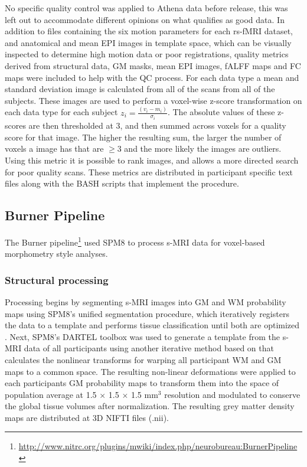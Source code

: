\documentclass[preprint,12pt,5p]{elsarticle}
\begin{document}
\begin{itemize}
No specific quality control was applied to Athena data before release, this was left out to accommodate different opinions on what qualifies as good data. In addition to files containing the six motion parameters for each rs-fMRI dataset, and anatomical and mean EPI images in template space, which can be visually inspected to determine high motion data or poor registrations, quality metrics derived from structural data, GM masks, mean EPI images, fALFF maps and FC maps were included to help with the QC process. For each data type a mean and standard deviation image is calculated from all of the scans from all of the subjects. These images are used to perform a voxel-wise z-score transformation on each data type for each subject $z_i = \frac{(v_i-m_i)}{\sigma_i}$. The absolute values of these z-scores are then thresholded at 3, and then summed across voxels for a quality score for that image. The higher the resulting sum, the larger the number of voxels a image has that are $\geq 3$ and the more likely the images are outliers. Using this metric it is possible to rank images, and allows a more directed search for poor quality scans. These metrics are distributed in participant specific text files along with the BASH scripts that implement the procedure.

\subsection{Burner Pipeline}

The Burner pipeline\footnote{\url{http://www.nitrc.org/plugins/mwiki/index.php/neurobureau:BurnerPipeline}} used SPM8 \cite{ashburner2012spm8} to process s-MRI data for voxel-based morphometry \cite{ashburner2000vbm} style analyses.

\subsubsection{Structural processing} 

Processing begins by segmenting s-MRI images into GM and WM probability maps using SPM8's unified segmentation procedure, which iteratively registers the data to a template and performs tissue classification until both are optimized \cite{ashburner2005unified}. Next, SPM8's DARTEL toolbox \cite{ashburner2007dartel} was used to generate a template from the s-MRI data of all participants using another iterative method based on that calculates the nonlinear transforms for warping all participant WM and GM maps to a common space. The resulting non-linear deformations were applied to each participants GM probability maps to transform them into the space of population average at 1.5 $\times$ 1.5 $\times$ 1.5 mm$^3$ resolution and modulated to conserve the global tissue volumes after normalization. The resulting grey matter density maps are distributed at 3D NIFTI files (.nii).


\end{itemize}
\end{document}
